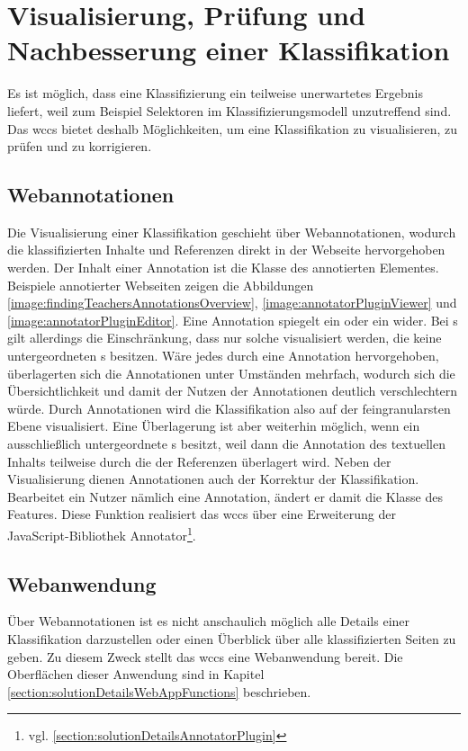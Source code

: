 \section{Visualisierung, Prüfung und Nachbesserung einer Klassifikation}
    \label{section:conceptVisualization}
    Es ist möglich, dass eine Klassifizierung ein teilweise unerwartetes Ergebnis liefert,
    weil zum Beispiel Selektoren im Klassifizierungsmodell unzutreffend sind.
    Das \gls{wccs} bietet deshalb Möglichkeiten,
    um eine Klassifikation zu visualisieren, zu prüfen und zu korrigieren.

    \subsection{Webannotationen}
        \label{section:conceptWebAnnotations}
        Die Visualisierung einer Klassifikation geschieht über Webannotationen,
        wodurch die klassifizierten Inhalte und Referenzen direkt in der Webseite hervorgehoben werden.
        Der Inhalt einer Annotation ist die Klasse des annotierten Elementes.
        Beispiele annotierter Webseiten zeigen die Abbildungen
        \ref{image:findingTeachersAnnotationsOverview},
        \ref{image:annotatorPluginViewer} und \ref{image:annotatorPluginEditor}.
        Eine Annotation spiegelt ein {} oder ein
        {\contentFeature} wider.
        Bei {\contentFeature}s gilt allerdings die Einschränkung,
        dass nur solche visualisiert werden,
        die keine untergeordneten {\contentFeature}s besitzen.
        Wäre jedes {\contentFeature} durch eine Annotation hervorgehoben,
        überlagerten sich die Annotationen unter Umständen mehrfach,
        wodurch sich die Übersichtlichkeit
        und damit der Nutzen der Annotationen deutlich verschlechtern würde.
        Durch Annotationen wird die Klassifikation also auf der feingranularsten Ebene visualisiert.
        Eine Überlagerung ist aber weiterhin möglich,
        wenn ein {\contentFeature} ausschließlich untergeordnete {}s besitzt,
        weil dann die Annotation des textuellen Inhalts teilweise durch die
        der Referenzen überlagert wird.
        Neben der Visualisierung dienen Annotationen auch der Korrektur der Klassifikation.
        Bearbeitet ein Nutzer nämlich eine Annotation,
        ändert er damit die Klasse des Features.
        Diese Funktion realisiert das \gls{wccs} über eine Erweiterung der JavaScript-Bibliothek
        Annotator\footnote{vgl. \ref{section:solutionDetailsAnnotatorPlugin}}.
    
    \subsection{Webanwendung}
        \label{section:solutionConceptWebApp}
        Über Webannotationen ist es nicht anschaulich möglich alle Details einer Klassifikation darzustellen
        oder einen Überblick über alle klassifizierten Seiten zu geben.
        Zu diesem Zweck stellt das \gls{wccs} eine Webanwendung bereit.
        Die Oberflächen dieser Anwendung sind in Kapitel \ref{section:solutionDetailsWebAppFunctions}
        beschrieben.
